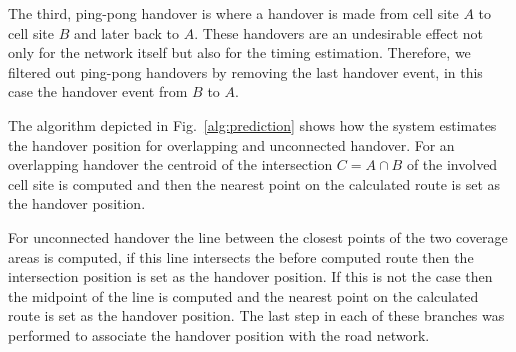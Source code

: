 The third, ping-pong handover is where a handover is made from cell site $A$ to cell site $B$ and later back to $A$. These handovers are an undesirable effect not only for the network itself but also for the timing estimation. Therefore, we filtered out ping-pong handovers by removing the last handover event, in this case the handover event from $B$ to $A$.

The algorithm depicted in Fig.~\ref{alg:prediction} shows how the system estimates the handover position for overlapping and unconnected handover. For an overlapping handover the centroid of the intersection $C=A \cap B$ of the involved cell site is computed and then the nearest point on the calculated route is set as the handover position. 

For unconnected handover the line between the closest points of the two coverage areas is computed, if this line intersects the before computed route then the intersection position is set as the handover position. If this is not the case then the midpoint of the line is computed and the nearest point on the calculated route is set as the handover position. The last step in each of these branches was performed to associate the handover position with the road network.
%
%
%
% 
